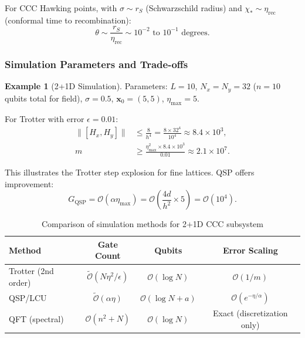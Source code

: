\documentclass[11pt,a4paper]{article}
\newcommand{\Order}{\mathcal{O}}
\newcommand{\Otilde}{\widetilde{\mathcal{O}}}
\newcommand{\vecx}{\bm{x}}
\theoremstyle{plain}
\theoremstyle{definition}
\newtheorem{example}[theorem]{Example}
\theoremstyle{remark}
\begin{document}
For CCC Hawking points, with $\sigma \sim r_S$ (Schwarzschild radius) and $\chi_* \sim \eta_{\text{rec}}$ (conformal time to recombination):
\begin{equation}
    \theta \sim \frac{r_S}{\eta_{\text{rec}}} \sim 10^{-2} \text{ to } 10^{-1} \text{ degrees}.
\end{equation}

\subsubsection{Simulation Parameters and Trade-offs}

\begin{example}[2+1D Simulation]
Parameters: $L = 10$, $N_x = N_y = 32$ ($n = 10$ qubits total for field), $\sigma = 0.5$, $\vecx_0 = (5, 5)$, $\eta_{\max} = 5$.

For Trotter with error $\epsilon = 0.01$:
\begin{align}
    \|[H_x, H_y]\| &\leq \frac{8}{h^4} = \frac{8 \times 32^4}{10^4} \approx 8.4 \times 10^3,\\
    m &\geq \frac{\eta_{\max}^2 \times 8.4 \times 10^3}{0.01} \approx 2.1 \times 10^7.
\end{align}

This illustrates the Trotter step explosion for fine lattices. QSP offers improvement:
\begin{equation}
    G_{\text{QSP}} = \Order\left(\alpha \eta_{\max}\right) = \Order\left(\frac{4d}{h^2} \times 5\right) = \Order(10^4).
\end{equation}
\end{example}

\begin{table}[h]
\centering
\caption{Comparison of simulation methods for 2+1D CCC subsystem}
\label{tab:method_comparison}
\begin{tabular}{lccc}
\toprule
\textbf{Method} & \textbf{Gate Count} & \textbf{Qubits} & \textbf{Error Scaling} \\
\midrule
Trotter (2nd order) & $\Otilde(N \eta^2/\epsilon)$ & $\Order(\log N)$ & $\Order(1/m)$ \\
QSP/LCU & $\Otilde(\alpha \eta)$ & $\Order(\log N + a)$ & $\Order(e^{-\eta/\alpha})$ \\
QFT (spectral) & $\Order(n^2 + N)$ & $\Order(\log N)$ & Exact (discretization only) \\
\bottomrule
\end{tabular}
\end{table}
\end{document}
